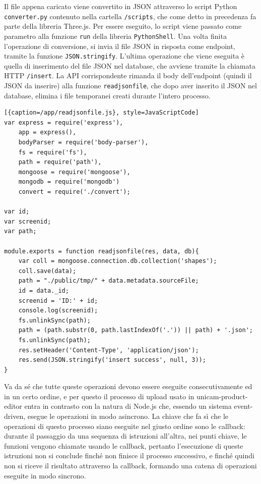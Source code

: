 Il file appena caricato viene convertito in JSON attraverso lo script Python \texttt{converter.py} contenuto nella cartella \texttt{/scripts}, che come detto in precedenza fa parte della libreria Three.js. Per essere eseguito, lo script viene passato come parametro alla funzione \texttt{run} della libreria \texttt{PythonShell}. Una volta finita l'operazione di conversione, si invia il file JSON in risposta come endpoint, tramite la funzione \texttt{JSON.stringify}.
L'ultima operazione che viene eseguita è quella di inserimento del file JSON nel database, che avviene tramite la chiamata HTTP \texttt{/insert}. La API corrispondente rimanda il body dell'endpoint (quindi il JSON da inserire) alla funzione \texttt{readjsonfile}, che dopo aver inserito il JSON nel database, elimina i file temporanei creati durante l'intero processo.
\begin{lstlisting}[{caption=/app/readjsonfile.js}, style=JavaScriptCode]
var express = require('express'),
	app = express(),
	bodyParser = require('body-parser'),
	fs = require('fs'),
	path = require('path'),
	mongoose = require('mongoose'),
	mongodb = require('mongodb')
	convert = require('./convert');

var id;
var screenid;
var path;

module.exports = function readjsonfile(res, data, db){
	var coll = mongoose.connection.db.collection('shapes');
	coll.save(data);
	path = "./public/tmp/" + data.metadata.sourceFile;
	id = data._id;
	screenid = 'ID:' + id;
	console.log(screenid);
	fs.unlinkSync(path);
	path = (path.substr(0, path.lastIndexOf('.')) || path) + '.json';
	fs.unlinkSync(path);
	res.setHeader('Content-Type', 'application/json');
	res.send(JSON.stringify('insert success', null, 3));
}
\end{lstlisting}

Va da sé che tutte queste operazioni devono essere eseguite consecutivamente ed in un certo ordine, e per questo il processo di upload usato in unicam-product-editor entra in contrasto con la natura di Node.js che, essendo un sistema event-driven, esegue le operazioni in modo asincrono.
La chiave che fa sì che le operazioni di questo processo siano eseguite nel giusto ordine sono le callback: durante il passaggio da una sequenza di istruzioni all'altra, nei punti chiave, le funzioni vengono chiamate usando le callback, pertanto l'esecuzione di queste istruzioni non si conclude finché non finisce il processo successivo, e finché quindi non si riceve il risultato attraverso la callback, formando una catena di operazioni eseguite in modo sincrono.
